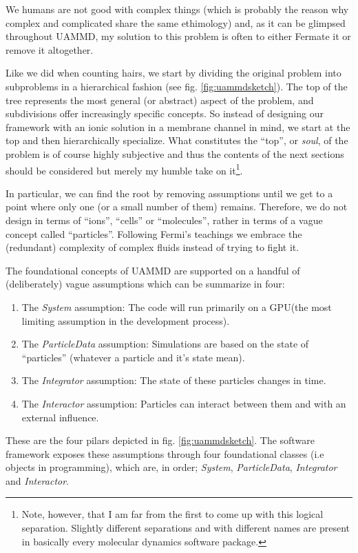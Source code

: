 \documentclass[ twoside,openright,titlepage,numbers=noenddot,%
headinclude,footinclude,cleardoublepage=empty,abstract=on,
BCOR=5mm,paper=a4,fontsize=11pt, dvipsnames
]{scrreprt}
\newcommand{\uammd}{\gls{UAMMD}\xspace}
\newcommand{\gpu}{\gls{GPU}\xspace}
\begin{document}
We humans are not good with complex things (which is probably the reason why complex and complicated share the same ethimology) and, as it can be glimpsed throughout \uammd, my solution to this problem is often to either Fermate it or remove it altogether.

Like we did when counting hairs, we start by dividing the original problem into subproblems in a hierarchical fashion (see fig. \ref{fig:uammdsketch}). The top of the tree represents the most general (or abstract) aspect of the problem, and subdivisions offer increasingly specific concepts. So instead of designing our framework with an ionic solution in a membrane channel in mind, we start at the top and then hierarchically specialize. What constitutes the ``top'', or \emph{soul}, of the problem is of course highly subjective and thus the contents of the next sections should be considered but merely my humble take on it\footnote{Note, however, that I am far from the first to come up with this logical separation. Slightly different separations and with different names are present in basically every molecular dynamics software package.}.

In particular, we can find the root by removing assumptions until we get to a point where only one (or a small number of them) remains. Therefore, we do not design in terms of ``ions'', ``cells'' or ``molecules'', rather in terms of a vague concept called ``particles''.
Following Fermi's teachings we embrace the (redundant) complexity of complex fluids instead of trying to fight it.


The foundational concepts of \uammd are supported on a handful of (deliberately) vague assumptions which can be summarize in four:
\begin{enumerate}[label=\textbf{S.\arabic*}]
\item The \emph{System} assumption: The code will run primarily on a \gpu (the most limiting assumption in the development process).
\item The \emph{ParticleData} assumption: Simulations are based on the state of ``particles'' (whatever a particle and it's state mean).
\item The \emph{Integrator} assumption: The state of these particles changes in time.
\item The \emph{Interactor} assumption: Particles can interact between them and with an external influence.
\end{enumerate}
These are the four pilars depicted in fig. \ref{fig:uammdsketch}. The software framework exposes these assumptions through four foundational classes (i.e objects in programming), which are, in order; \emph{System}, \emph{ParticleData}, \emph{Integrator} and \emph{Interactor}.
\end{document}
